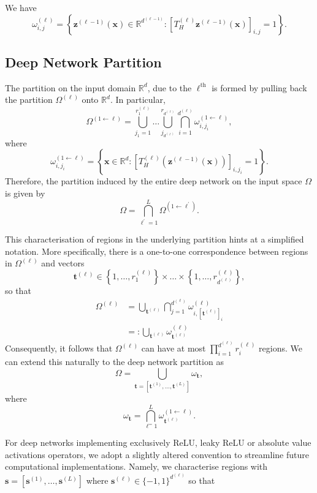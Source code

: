 \begin{proposition}
    We have $$\omega^{(\ell)}_{i,j}=\left\{\mathbf{z}^{(\ell-1)}(\mathbf{x})\in\mathbb{R}^{d^{(\ell-1)}}:\left[T^{(\ell)}_H\mathbf{z}^{(\ell-1)}(\mathbf{x})\right]_{i,j}=1\right\}.$$
\end{proposition}

\subsection{Deep Network Partition}

The partition on the input domain $\mathbb{R}^d$, due to the $\ell^{\text{th}}$ is formed by pulling back the partition $\Omega^{(\ell)}$ onto $\mathbb{R}^d$. In particular, $$\Omega^{(1\leftarrow\ell)}=\bigcup_{j_1=1}^{r_1^{(\ell)}}\dots\bigcup_{j_{d^{(\ell)}}}^{r_{d^{(\ell)}}}\bigcap_{i=1}^{d^{(\ell)}}\omega_{i,j_i}^{(1\leftarrow\ell)},$$where $$\omega^{(1\leftarrow\ell)}_{i,j_i}=\left\{\mathbf{x}\in\mathbb{R}^d:\left[T_H^{(\ell)}\left(\mathbf{z}^{(\ell-1)}(\mathbf{x})\right)\right]_{i,j_i}=1\right\}.$$Therefore, the partition induced by the entire deep network on the input space $\Omega$ is given by $$\Omega=\bigcap_{\ell^\prime=1}^L\Omega^{\left(1\leftarrow\ell^\prime\right)}.$$

This characterisation of regions in the underlying partition hints at a simplified notation. More specifically, there is a one-to-one correspondence between regions in $\Omega^{(\ell)}$ and vectors $$\mathbf{t}^{(\ell)}\in\left\{1,\dots,r_1^{(\ell)}\right\}\times\dots\times\left\{1,\dots,r_{d^{(\ell)}}^{(\ell)}\right\},$$so that
\begin{align*}
    \Omega^{(\ell)}&=\bigcup_{\mathbf{t}^{(\ell)}}\bigcap_{j=1}^{d^{(\ell)}}\omega_{i,\left[\mathbf{t}^{(\ell)}\right]_i}^{(\ell)}\\&=:\bigcup_{\mathbf{t}^{(\ell)}}\omega^{(\ell)}_{\mathbf{t}^{(\ell)}}
\end{align*}
Consequently, it follows that $\Omega^{(\ell)}$ can have at most $\prod_{i=1}^{d^{(\ell)}}r_i^{(\ell)}$ regions. We can extend this naturally to the deep network partition as $$\Omega=\bigcup_{\mathbf{t}=\left[\mathbf{t}^{(1)},\dots,\mathbf{t}^{(L)}\right]}\omega_{\mathbf{t}},$$where $$\omega_{\mathbf{t}}=\bigcap_{\ell^=1}^{L}\omega^{(1\leftarrow\ell)}_{\mathbf{t}^{(\ell)}}.$$

For deep networks implementing exclusively ReLU, leaky ReLU or absolute value activations operators, we adopt a slightly altered convention to streamline future computational implementations. Namely, we characterise regions with $\mathbf{s}=\left[\mathbf{s}^{(1)},\dots,\mathbf{s}^{(L)}\right]$ where $\mathbf{s}^{(\ell)}\in\{-1,1\}^{d^{(\ell)}}$ so that

